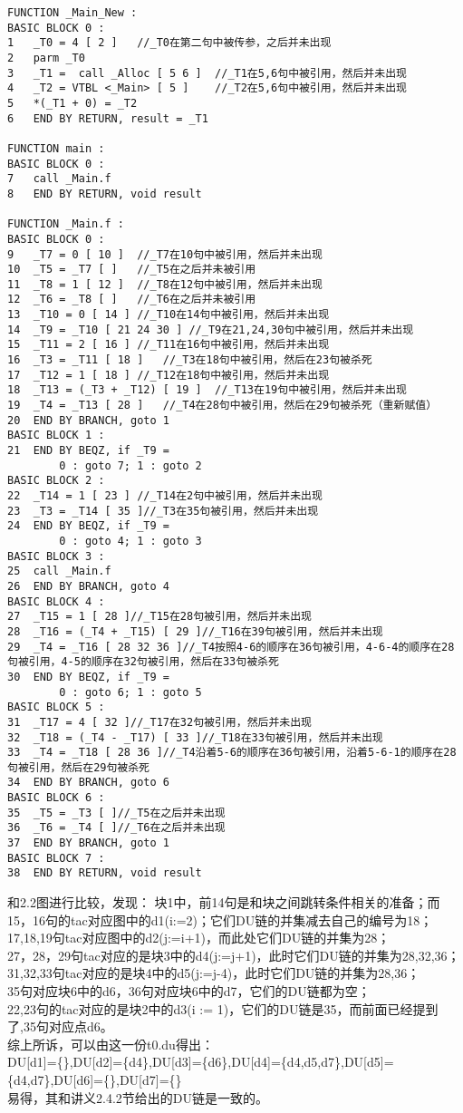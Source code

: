 \documentclass[UTF8]{ctexart}
\begin{document}
\begin{lstlisting}[caption={}]
FUNCTION _Main_New : 
BASIC BLOCK 0 : 
1	_T0 = 4 [ 2 ]	//_T0在第二句中被传参，之后并未出现
2	parm _T0
3	_T1 =  call _Alloc [ 5 6 ]	//_T1在5,6句中被引用，然后并未出现
4	_T2 = VTBL <_Main> [ 5 ]	//_T2在5,6句中被引用，然后并未出现
5	*(_T1 + 0) = _T2
6	END BY RETURN, result = _T1

FUNCTION main : 
BASIC BLOCK 0 : 
7	call _Main.f
8	END BY RETURN, void result

FUNCTION _Main.f : 
BASIC BLOCK 0 : 
9	_T7 = 0 [ 10 ]	//_T7在10句中被引用，然后并未出现
10	_T5 = _T7 [ ]	//_T5在之后并未被引用
11	_T8 = 1 [ 12 ]	//_T8在12句中被引用，然后并未出现
12	_T6 = _T8 [ ]	//_T6在之后并未被引用
13	_T10 = 0 [ 14 ]	//_T10在14句中被引用，然后并未出现
14	_T9 = _T10 [ 21 24 30 ]	//_T9在21,24,30句中被引用，然后并未出现
15	_T11 = 2 [ 16 ]	//_T11在16句中被引用，然后并未出现
16	_T3 = _T11 [ 18 ]	//_T3在18句中被引用，然后在23句被杀死
17	_T12 = 1 [ 18 ]	//_T12在18句中被引用，然后并未出现
18	_T13 = (_T3 + _T12) [ 19 ]	//_T13在19句中被引用，然后并未出现
19	_T4 = _T13 [ 28 ]	//_T4在28句中被引用，然后在29句被杀死（重新赋值）
20	END BY BRANCH, goto 1
BASIC BLOCK 1 : 
21	END BY BEQZ, if _T9 = 
	    0 : goto 7; 1 : goto 2
BASIC BLOCK 2 : 
22	_T14 = 1 [ 23 ]	//_T14在2句中被引用，然后并未出现
23	_T3 = _T14 [ 35 ]//_T3在35句被引用，然后并未出现
24	END BY BEQZ, if _T9 = 
	    0 : goto 4; 1 : goto 3
BASIC BLOCK 3 : 
25	call _Main.f
26	END BY BRANCH, goto 4
BASIC BLOCK 4 : 
27	_T15 = 1 [ 28 ]//_T15在28句被引用，然后并未出现
28	_T16 = (_T4 + _T15) [ 29 ]//_T16在39句被引用，然后并未出现
29	_T4 = _T16 [ 28 32 36 ]//_T4按照4-6的顺序在36句被引用，4-6-4的顺序在28句被引用，4-5的顺序在32句被引用，然后在33句被杀死
30	END BY BEQZ, if _T9 = 
	    0 : goto 6; 1 : goto 5
BASIC BLOCK 5 : 
31	_T17 = 4 [ 32 ]//_T17在32句被引用，然后并未出现
32	_T18 = (_T4 - _T17) [ 33 ]//_T18在33句被引用，然后并未出现
33	_T4 = _T18 [ 28 36 ]//_T4沿着5-6的顺序在36句被引用，沿着5-6-1的顺序在28句被引用，然后在29句被杀死
34	END BY BRANCH, goto 6
BASIC BLOCK 6 : 
35	_T5 = _T3 [ ]//_T5在之后并未出现
36	_T6 = _T4 [ ]//_T6在之后并未出现
37	END BY BRANCH, goto 1
BASIC BLOCK 7 : 
38	END BY RETURN, void result
\end{lstlisting}
和2.2图进行比较，发现：
块1中，前14句是和块之间跳转条件相关的准备；而15，16句的tac对应图中的d1(i:=2)；它们DU链的并集减去自己的编号为{18}；\\
17,18,19句tac对应图中的d2(j:=i+1)，而此处它们DU链的并集为{28}；\\
27，28，29句tac对应的是块3中的d4(j:=j+1)，此时它们DU链的并集为{28,32,36}；\\
31,32,33句tac对应的是块4中的d5(j:=j-4)，此时它们DU链的并集为{28,36}；\\
35句对应块6中的d6，36句对应块6中的d7，它们的DU链都为空；\\
22,23句的tac对应的是块2中的d3(i := 1)，它们的DU链是35，而前面已经提到了,35句对应点d6。\\
综上所诉，可以由这一份t0.du得出：\\
DU[d1]=\{\},DU[d2]=\{d4\},DU[d3]=\{d6\},DU[d4]=\{d4,d5,d7\},DU[d5]=\{d4,d7\},DU[d6]=\{\},DU[d7]=\{\}\\
易得，其和讲义2.4.2节给出的DU链是一致的。
\end{document}
